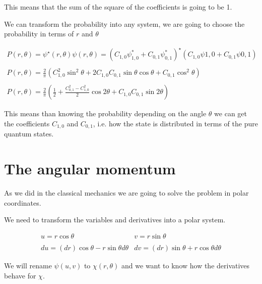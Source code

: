 This means that the sum of the square of the coefficients is going to be 1.

We can transform the probability into any system, we are going to choose the probability in terms of $r$ and $\theta$

\begin{equation}
  \begin{array}{c}
    P(r,\theta) = \psi^{\star}(r,\theta)\psi(r,\theta) = \left(C_{1,0} \psi^*_{1,0} + C_{0,1} \psi^*_{0,1}\right)^{\star} \left(C_{1,0} \psi{1,0} + C_{0,1} \psi{0,1}\right)
    \\

    \\
    P(r,\theta) = \frac{2}{\pi} \left(C_{1,0}^2\sin^2\theta + 2C_{1,0}C_{0,1} \sin\theta \cos\theta + C_{0,1}\cos^2\theta \right)
    \\

    \\
    P(r,\theta) = \frac{2}{\pi} \left(\frac{1}{2}+\frac{C_{0,1}^2-C_{1,0}^2}{2}\cos 2\theta + C_{1,0}C_{0,1} \sin 2\theta \right)
\end{array}
\end{equation}

This means than knowing the probability depending on the angle $\theta$ we can get the coefficients $C_{1,0}$ and $C_{0,1}$, i.e. how the state is distributed in terms of the pure quantum states.

\section{The angular momentum}

As we did in the classical mechanics we are going to solve the problem in polar coordinates.

We need to transform the variables and derivatives into a polar system.

\begin{equation}
  \begin{array}{cc}
    u = r \cos\theta & v = r \sin\theta
    \\

    \\
    du = (dr) \cos\theta - r \sin\theta d\theta & dv = (dr) \sin\theta + r \cos\theta d\theta
  \end{array}
\end{equation}

We will rename $\psi(u,v)$ to $\chi(r,\theta)$ and we want to know how the derivatives behave for $\chi$.

